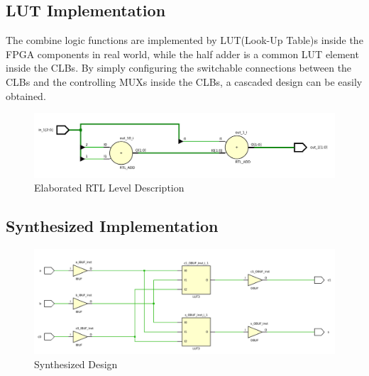 \documentclass[conference]{IEEEtran}
\begin{document}
\subsection{LUT Implementation}



The combine logic functions are implemented by LUT(Look-Up Table)s inside the FPGA components in real world, while the half adder is a common LUT element inside the CLBs. By simply configuring the switchable connections between the CLBs and the controlling MUXs inside the CLBs, a cascaded design can be easily obtained.

\begin{figure}[htpb]
	\begin{center}
		\includegraphics[width=0.97\linewidth]{report_lab2.assets/20240307172354.png}
		\caption{Elaborated RTL Level Description}
		\label{elaborated_lut_level_sch}
	\end{center}
\end{figure}

\subsection{Synthesized Implementation}

\begin{figure}[htpb]
	\begin{center}
		\includegraphics[width=0.97\linewidth]{report_lab2.assets/20240307172835.png}
		\caption{Synthesized Design}
		\label{FA_synth}
	\end{center}
\end{figure}
\end{document}
